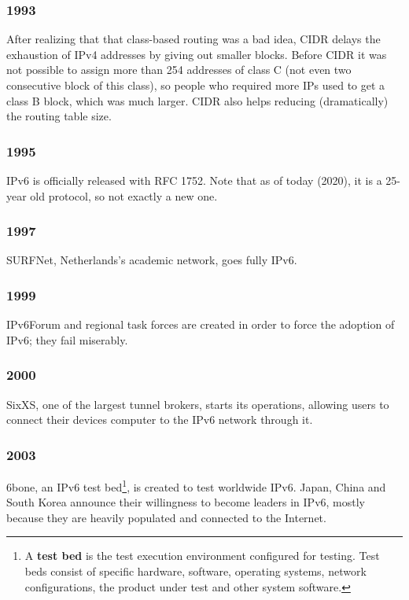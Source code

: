 
\subsubsection*{1993}
After realizing that that class-based routing was a bad idea, CIDR delays the exhaustion of IPv4 addresses by giving out smaller blocks. Before CIDR it was not possible to assign more than 254 addresses of class C (not even two consecutive block of this class), so people who required more IPs used to get a class B block, which was much larger. CIDR also helps reducing (dramatically) the routing table size.


\subsubsection*{1995}
IPv6 is officially released with RFC 1752. Note that as of today (2020), it is a 25-year old protocol, so not exactly a new one.


\subsubsection*{1997}
SURFNet, Netherlands’s academic network, goes fully IPv6.


\subsubsection*{1999}
IPv6Forum and regional task forces are created in order to force the adoption of IPv6; they fail miserably.


\subsubsection*{2000}
SixXS, one of the largest tunnel brokers, starts its operations, allowing users to connect their devices computer to the IPv6 network through it.


\subsubsection*{2003}
6bone, an IPv6 test bed\footnote{A \textbf{test bed} is the test execution environment configured for testing. Test beds consist of specific hardware, software, operating systems, network configurations, the product under test and other system software.}, is created to test worldwide IPv6. Japan, China and South Korea announce their willingness to become leaders in IPv6, mostly because they are heavily populated and connected to the Internet.

